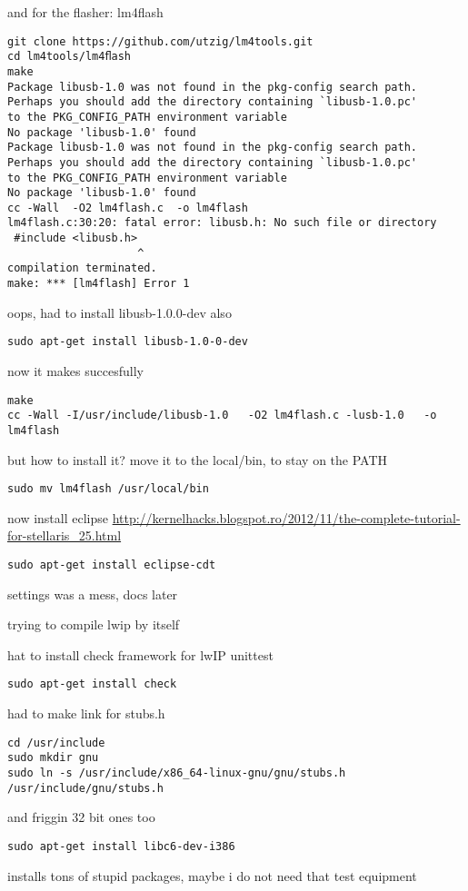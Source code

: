 \documentclass{article}
\begin{document}
and for the flasher: lm4flash
\begin{verbatim}
git clone https://github.com/utzig/lm4tools.git
cd lm4tools/lm4ﬂash
make
Package libusb-1.0 was not found in the pkg-config search path.
Perhaps you should add the directory containing `libusb-1.0.pc'
to the PKG_CONFIG_PATH environment variable
No package 'libusb-1.0' found
Package libusb-1.0 was not found in the pkg-config search path.
Perhaps you should add the directory containing `libusb-1.0.pc'
to the PKG_CONFIG_PATH environment variable
No package 'libusb-1.0' found
cc -Wall  -O2 lm4flash.c  -o lm4flash
lm4flash.c:30:20: fatal error: libusb.h: No such file or directory
 #include <libusb.h>
                    ^
compilation terminated.
make: *** [lm4flash] Error 1
\end{verbatim}
oops, had to install libusb-1.0.0-dev also
\begin{verbatim}
sudo apt-get install libusb-1.0-0-dev
\end{verbatim}
now it makes succesfully
\begin{verbatim}
make
cc -Wall -I/usr/include/libusb-1.0   -O2 lm4flash.c -lusb-1.0   -o lm4flash
\end{verbatim}
but how to install it?
move it to the local/bin, to stay on the PATH
\begin{verbatim}
sudo mv lm4flash /usr/local/bin
\end{verbatim}

now install eclipse
\url{http://kernelhacks.blogspot.ro/2012/11/the-complete-tutorial-for-stellaris_25.html}
\begin{verbatim}
sudo apt-get install eclipse-cdt
\end{verbatim}
settings was a mess, docs later

trying to compile lwip by itself

hat to install check framework for lwIP unittest
\begin{verbatim}
sudo apt-get install check
\end{verbatim}

had to make link for stubs.h
\begin{verbatim}
cd /usr/include
sudo mkdir gnu
sudo ln -s /usr/include/x86_64-linux-gnu/gnu/stubs.h /usr/include/gnu/stubs.h
\end{verbatim}

and friggin 32 bit ones too
\begin{verbatim}
sudo apt-get install libc6-dev-i386
\end{verbatim}
installs tons of stupid packages, maybe i do not need that test equipment
\end{document}
